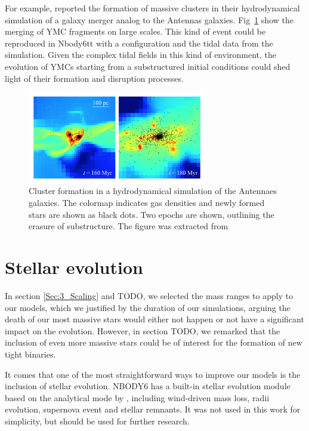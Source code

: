 For example, \cite{Renaud2015b} reported the formation of massive clusters in their hydrodynamical simulation of a galaxy merger analog to the Antennas galaxies. Fig~\ref{Fig:7_renaud} show the merging of YMC fragments on large scales. This kind of event could be reproduced in Nbody6tt with a \HubLem configuration and the tidal data from the simulation. Given the complex tidal fields in this kind of environment, the evolution of YMCs starting from a substructured initial conditions could shed light of their formation and disruption processes.


\begin{figure}
\begin{center}
\includegraphics[width=0.7\textwidth]{Figures/7_renaudantennas.png}
\end{center}
\caption{Cluster formation in a hydrodynamical simulation of the Antennaes galaxies. The colormap indicates gas densities and newly formed stars are shown as black dots. Two epochs are shown, outlining the erasure of substructure. The figure was extracted from \cite{Renaud2015b} }
\label{Fig:7_renaud}
\end{figure} 



\section{Stellar evolution}

In section \ref{Sec:3_Scaling} and TODO, we selected the mass ranges to apply to our models, which we justified by the duration of our simulations, arguing the death of our most massive stars would either not happen or not have a significant impact on the evolution. However, in section TODO, we remarked that the inclusion of even more massive stars could be of interest for the formation of new tight binaries.

It comes that one of the most straightforward ways to improve our models is the inclusion of stellar evolution. NBODY6 has a built-in stellar evolution module based on the analytical mode by \cite{Hurley2000}, including wind-driven mass loss, radii evolution, supernova event and stellar remnants. It was not used in this work for simplicity, but should be used for further research.


